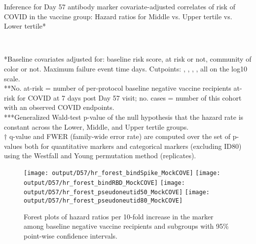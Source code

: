 \documentclass[
]{article}
\begin{document}
\begin{table}[H]
\caption{Inference for Day 57 antibody marker covariate-adjusted correlates of risk of COVID in the vaccine group: Hazard ratios for Middle vs. Upper tertile vs. Lower tertile*}
\begin{center}
\setlength{\tabcolsep}{.5ex}
\\
\end{center}
*Baseline covariates adjusted for: baseline risk score, at risk or not, community of color or not. 
Maximum failure event time \protect days.
Cutpoints:
,  
,  
,
,
all on the log10 scale.
\\
**No. at-risk = number of per-protocol baseline negative vaccine recipients at-risk for COVID at 7 days post Day 57 visit; no. cases = number of this cohort with an observed COVID endpoints.\\
***Generalized Wald-test p-value of the null hypothesis that the hazard rate is constant across the Lower, Middle, and Upper tertile groups.\\
$\dagger$ q-value and FWER (family-wide error rate) are computed over the set of p-values both for quantitative markers and categorical markers (excluding ID80) using the Westfall and Young permutation method (\protect replicates). 

\end{table}

\begin{figure}[H]
    \texttt{[image: output/D57/hr\_forest\_bindSpike\_MockCOVE]}
    \texttt{[image: output/D57/hr\_forest\_bindRBD\_MockCOVE]}
    \texttt{[image: output/D57/hr\_forest\_pseudoneutid50\_MockCOVE]}
    \texttt{[image: output/D57/hr\_forest\_pseudoneutid80\_MockCOVE]}
    \caption{Forest plots of hazard ratios per 10-fold increase in the marker among baseline negative vaccine recipients and subgroups with 95\% point-wise confidence intervals.}
\end{figure}
\clearpage
\end{document}
